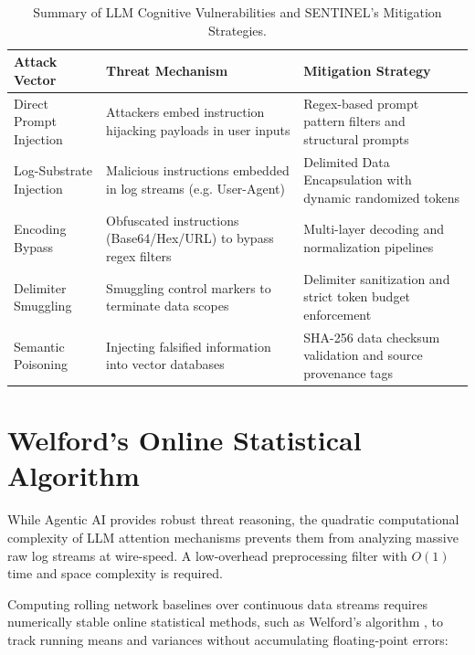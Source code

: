 \begin{table}[H]
    \centering
    \caption{Summary of LLM Cognitive Vulnerabilities and SENTINEL's Mitigation Strategies.}
    \label{tab:vulnerabilities_mitigations}
    \begin{tabular}{|>{\raggedright\arraybackslash}p{}|>{\raggedright\arraybackslash}p{}|>{\raggedright\arraybackslash}p{}|}
        \hline
        \textbf{Attack Vector} & \textbf{Threat Mechanism} & \textbf{Mitigation Strategy} \\
        \hline
        Direct Prompt Injection & Attackers embed instruction hijacking payloads in user inputs & Regex-based prompt pattern filters and structural prompts \\
        \hline
        Log-Substrate Injection & Malicious instructions embedded in log streams (e.g. User-Agent) & Delimited Data Encapsulation with dynamic randomized tokens \\
        \hline
        Encoding Bypass & Obfuscated instructions (Base64/Hex/URL) to bypass regex filters & Multi-layer decoding and normalization pipelines \\
        \hline
        Delimiter Smuggling & Smuggling control markers to terminate data scopes & Delimiter sanitization and strict token budget enforcement \\
        \hline
        Semantic Poisoning & Injecting falsified information into vector databases & SHA-256 data checksum validation and source provenance tags \\
        \hline
    \end{tabular}
\end{table}

\section{Welford's Online Statistical Algorithm}
\label{sec:welford}

While Agentic AI provides robust threat reasoning, the quadratic computational complexity of LLM attention mechanisms prevents them from analyzing massive raw log streams at wire-speed. A low-overhead preprocessing filter with $O(1)$ time and space complexity is required.

Computing rolling network baselines over continuous data streams requires numerically stable online statistical methods, such as Welford's algorithm \cite{welford1962}, to track running means and variances without accumulating floating-point errors:


